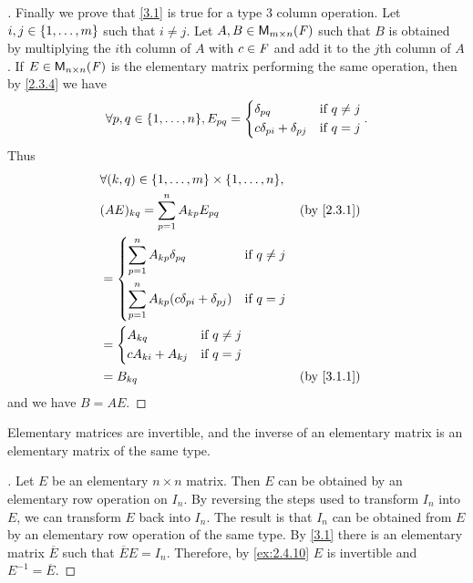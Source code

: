 \begin{proof}[]
  Finally we prove that \cref{3.1} is true for a type 3 column operation.
  Let \(i, j \in \left\lbrace1, \dots, m\right\rbrace\) such that \(i \neq j\).
  Let \(A, B \in \mathsf{M}_{{m} \times n}({\mathit{F}})\) such that \(B\) is obtained by multiplying the \(i\)th column of \(A\) with \(c \in \mathit{F}\) and add it to the \(j\)th column of \(A\).
  If \(E \in \mathsf{M}_{{n} \times n}({\mathit{F}})\) is the elementary matrix performing the same operation, then by \cref{2.3.4} we have
  \[
    \forall p, q \in \set{1, \dots, n}, E_{p q} = \begin{dcases}
      \delta_{p q}                  & \text{if } q \neq j \\
      c \delta_{p i} + \delta_{p j} & \text{if } q = j
    \end{dcases}.
  \]
  Thus
  \begin{align*}
     & \forall (k, q) \in \set{1, \dots, m} \times \set{1, \dots, n},                                                \\
     & (AE)_{k q} = \sum_{p = 1}^n A_{k p} E_{p q}                                     &  & \text{(by \cref{2.3.1})} \\
     & = \begin{dcases}
           \sum_{p = 1}^n A_{k p} \delta_{p q}                    & \text{if } q \neq j \\
           \sum_{p = 1}^n A_{k p} (c \delta_{p i} + \delta_{p j}) & \text{if } q = j
         \end{dcases}                                \\
     & = \begin{dcases}
           A_{k q}             & \text{if } q \neq j \\
           c A_{k i} + A_{k j} & \text{if } q = j
         \end{dcases}                                                                   \\
     & = B_{k q}                                                                       &  & \text{(by \cref{3.1.1})}
  \end{align*}
  and we have \(B = AE\).
\end{proof}

\begin{thm}\label{3.2}
  Elementary matrices are invertible, and the inverse of an elementary matrix is an elementary matrix of the same type.
\end{thm}

\begin{proof}[]
  Let \(E\) be an elementary \(n \times n\) matrix.
  Then \(E\) can be obtained by an elementary row operation on \(I_n\).
  By reversing the steps used to transform \(I_n\) into \(E\), we can transform \(E\) back into \(I_n\).
  The result is that \(I_n\) can be obtained from \(E\) by an elementary row operation of the same type.
  By \cref{3.1} there is an elementary matrix \(\overline{E}\) such that \(\overline{E} E = I_n\).
  Therefore, by \cref{ex:2.4.10} \(E\) is invertible and \(E^{-1} = \overline{E}\).
\end{proof}

